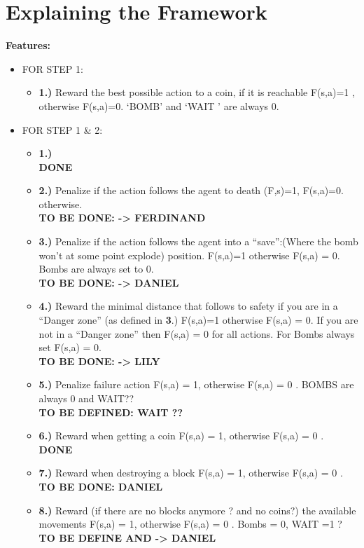 \documentclass[a4paper]{article}
\begin{document}
\section{Explaining the Framework}

\textbf{Features:}
\begin{itemize}

\item FOR STEP 1:
\begin{itemize} 
\item \textbf{1.)} Reward the best possible action to a coin, if it is reachable F(s,a)=1 ,  otherwise F(s,a)=0.    `BOMB' and `WAIT ' are always 0.
\end{itemize}

\item FOR STEP 1 \& 2:
\begin {itemize}
\item \textbf{1.)} \\  \textbf{DONE}  
\item  \textbf{2.)} Penalize if the action follows the agent to death (F,s)=1, F(s,a)=0. otherwise.  \\ \textbf{TO BE DONE: -> FERDINAND}
\item \textbf{3.)} Penalize if the action follows the agent into a ``save'':(Where the bomb won't at some point explode) position.  F(s,a)=1 otherwise F(s,a) = 0.  Bombs are always set to 0.
 \\  \textbf{TO BE DONE: -> DANIEL}  
 \item \textbf{4.)}  Reward the minimal distance that follows to safety if you are in a ``Danger zone'' (as defined in \textbf{3}.)  F(s,a)=1 otherwise F(s,a) = 0.
 If you are not in a ``Danger zone'' then F(s,a) =  0 for all actions.  For Bombs always set F(s,a) = 0.
  \\  \textbf{TO BE DONE: -> LILY}  
  \item \textbf{5.)} Penalize failure action F(s,a) = 1, otherwise F(s,a) = 0 .  
  BOMBS are always 0 and WAIT??
 \\  \textbf{TO BE DEFINED: WAIT ??}  
   \item \textbf{6.)} Reward when getting a coin F(s,a) = 1, otherwise F(s,a) = 0 .  
 \\  \textbf{DONE}  
 
    \item \textbf{7.)} Reward when destroying a block F(s,a) = 1, otherwise F(s,a) = 0 .  
 \\  \textbf{TO BE DONE: DANIEL}  
 
     \item \textbf{8.)} Reward (if there are no blocks anymore ? and no coins?)  the available movements F(s,a) = 1, otherwise F(s,a) = 0 .   Bombs = 0, WAIT =1 ? 
 \\  \textbf{TO BE DEFINE AND -> DANIEL}   
\end{itemize}



\end{itemize}
\end{document}

